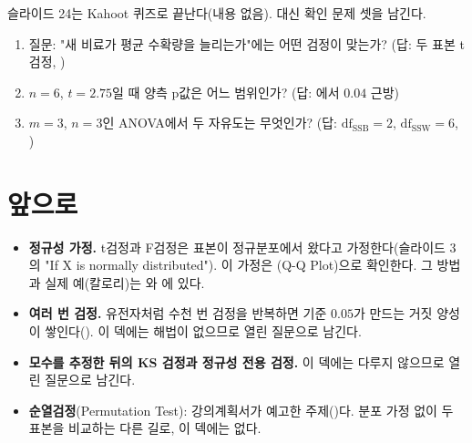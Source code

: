 슬라이드 24는 Kahoot 퀴즈로 끝난다(내용 없음). 대신 확인 문제 셋을
남긴다.

\begin{enumerate}
  \item 질문: "새 비료가 평균 수확량을 늘리는가"에는 어떤 검정이
        맞는가? (답: 두 표본 t검정, )
  \item $n = 6$, $t = 2.75$일 때 양측 p값은 어느 범위인가?
        (답: 에서 $0.04$ 근방)
  \item $m = 3$, $n = 3$인 ANOVA에서 두 자유도는 무엇인가?
        (답: $\text{df}_{\text{SSB}} = 2$, $\text{df}_{\text{SSW}} = 6$,
        )
\end{enumerate}

\section{앞으로}
\label{sec:cd-future}

\begin{itemize}
  \item \textbf{정규성 가정.} t검정과 F검정은 표본이 정규분포에서
        왔다고 가정한다(슬라이드 3의 "If X is
        normally distributed"). 이 가정은 (Q-Q Plot)으로
        확인한다.
        그 방법과 실제 예(칼로리)는 와 에 있다.
  \item \textbf{여러 번 검정.} 유전자처럼 수천 번 검정을 반복하면
        기준 $0.05$가 만드는 거짓 양성이 쌓인다().
        이 덱에는 해법이 없으므로 열린 질문으로 남긴다.
  \item \textbf{모수를 추정한 뒤의 KS 검정과 정규성 전용 검정.} 이
        덱에는 다루지 않으므로 열린 질문으로 남긴다.
  \item \textbf{순열검정}(Permutation Test): 강의계획서가 예고한
        주제()다. 분포 가정 없이 두 표본을
        비교하는 다른 길로, 이 덱에는 없다.
\end{itemize}
